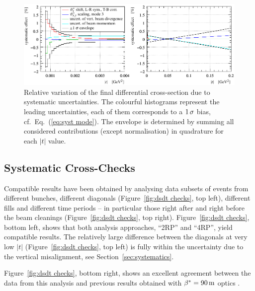 \begin{figure}
\begin{center}
\includegraphics{fig/systematics_dgn_combination_summary.pdf}
\vskip-2mm
\caption{%
Relative variation of the final differential cross-section due to systematic uncertainties. The colourful histograms represent the leading uncertainties, each of them corresponds to a $1\,{\rm \sigma}$ bias, cf.~Eq.~(\ref{eq:syst mode}). The envelope is determined by summing all considered contributions (except normalisation) in quadrature for each $|t|$ value.
}
\label{fig:syst unc}
\end{center}
\end{figure}





\subsection{Systematic Cross-Checks}
\label{sec:cross checks}

Compatible results have been obtained by analysing data subsets of events from different bunches, different diagonals (Figure~\ref{fig:dsdt checks}, top left), different fills and different time periods -- in particular those right after and right before the beam cleanings (Figure~\ref{fig:dsdt checks}, top right). Figure~\ref{fig:dsdt checks}, bottom left, shows that both analysis approaches, ``2RP'' and ``4RP'', yield compatible results. The relatively large difference between the diagonals at very low $|t|$ (Figure~\ref{fig:dsdt checks}, top left) is fully within the uncertainty due to the vertical misalignment, see Section~\ref{sec:systematics}.

Figure~\ref{fig:dsdt checks}, bottom right, shows an excellent agreement between the data from this analysis and previous results obtained with $\beta^* = 90\,{\rm m}$ optics \cite{totem-13tev-90m}.


